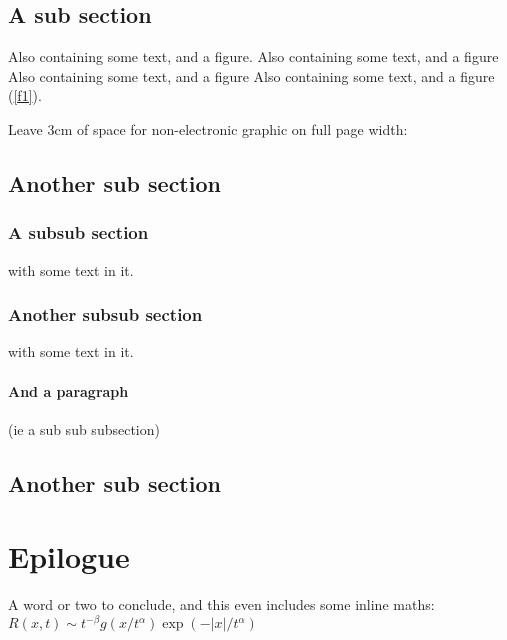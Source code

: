 \documentclass{elsart}
\begin{document}
\subsection{A sub section}
Also containing
some text, and a
figure. Also containing
some text, and a
figure
Also
containing some
text, and a figure
Also containing
some text, and a
figure (\ref{f1}).

\begin{figure*}
Leave 3cm of space for non-electronic graphic on full page width:
  \vspace{3cm}
\caption{A Caption}
\label{f1}
\end{figure*}
\subsection{Another sub section}
\subsubsection{A subsub section} with some text in it.
\subsubsection{Another subsub section}with some text in it.
\paragraph{And a paragraph}
(ie a sub sub subsection)

\subsection{Another sub section}
\section{Epilogue}
A word or two to conclude,  and this even includes some
inline maths: \(R(x,t)\sim
t^{-\beta}g(x/t^\alpha)\exp(-|x|/t^\alpha)\)
\end{document}
